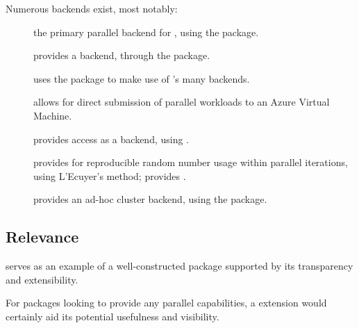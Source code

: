 Numerous backends exist, most notably:

\begin{description} \item[] the primary parallel backend for , using the  package\cite{corporation19}.
	\item[]
		provides a  backend, through the  package\cite{lewis20}.
	\item[]
		uses the  package to make use of 's many backends\cite{bengtsson20do}.
	\item[]
		allows for direct submission of parallel workloads to an Azure Virtual Machine\cite{hoang20}.
	\item[]
		provides  access as a backend, using \cite{weston17}.
	\item[]
		provides for reproducible random number usage within parallel
		iterations, using L'Ecuyer's method; provides \cite{gaujoux20}.
	\item[]
		provides an ad-hoc cluster backend, using the  package\cite{dosnow19}.
\end{description}

\subsection{Relevance}\label{relevance}

 serves as an example of a well-constructed package supported by
its transparency and extensibility.

For packages looking to provide any parallel capabilities, a  extension would certainly aid its potential usefulness and visibility.
